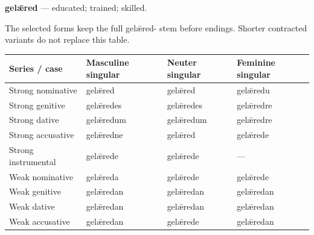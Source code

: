 \par\begin{minipage}{\linewidth}\raggedright
\textbf{gelǣred} — educated; trained; skilled.

The selected forms keep the full gelǣred- stem before endings. Shorter contracted variants do not replace this table.

\par\begingroup
\fontsize{10.5}{13.2}\selectfont
\setlength{\LTleft}{0pt}\setlength{\LTright}{\fill}
\noindent
\begin{tabular}{@{}>{\raggedright\arraybackslash}p{33.348mm}>{\raggedright\arraybackslash}p{28.726mm}>{\raggedright\arraybackslash}p{25.754mm}>{\raggedright\arraybackslash}p{27.735mm}@{}}
\toprule
\textbf{Series /\allowbreak{} case} & \textbf{Masculine singular} & \textbf{Neuter singular} & \textbf{Feminine singular} \\
\midrule
Strong nominative & gelǣred & gelǣred & gelǣredu \\
Strong genitive & gelǣredes & gelǣredes & gelǣredre \\
Strong dative & gelǣredum & gelǣredum & gelǣredre \\
Strong accusative & gelǣredne & gelǣred & gelǣrede \\
Strong instrumental & gelǣrede & gelǣrede & — \\
Weak nominative & gelǣreda & gelǣrede & gelǣrede \\
Weak genitive & gelǣredan & gelǣredan & gelǣredan \\
Weak dative & gelǣredan & gelǣredan & gelǣredan \\
Weak accusative & gelǣredan & gelǣrede & gelǣredan \\
\bottomrule
\end{tabular}
\par\endgroup
\end{minipage}\par
\par\addvspace{5pt}
\par\begingroup
\fontsize{10.5}{13.2}\selectfont
\setlength{\LTleft}{0pt}\setlength{\LTright}{\fill}
\noindent
